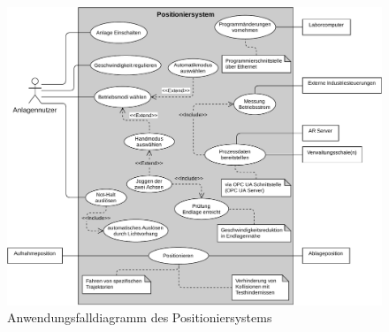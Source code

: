 \documentclass[../../../Bachelorarbeit.tex]{subfiles}
\begin{document}
\begin{figure}[H]
    \centering
    \includegraphics[width=\textwidth]{Images/use_case_dia.pdf}
    \caption[Anwendungsfalldiagramm]{Anwendungsfalldiagramm des Positioniersystems}
    \label{fig:my-img3}
\end{figure}
\end{document}

